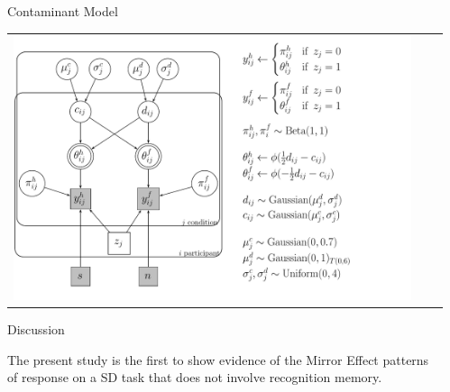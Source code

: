\documentclass[final]{beamer}
\newlength{\sepwid}
\newlength{\onecolwid}
\begin{document}
\begin{frame}[t]
\begin{columns}[t]
\begin{column}{\sepwid}\end{column} %

\setlength{\onecolwid}{0.252\paperwidth} %
\begin{column}{\onecolwid} %


\begin{alertblock}{Contaminant Model}


\begin{center}
\begin{tabular}{ccc}
\includegraphics[width=0.75\linewidth]{Figures/4_Contaminant.pdf}
\end{tabular}
\end{center}

\end{alertblock}



\begin{alertblock}{Discussion}

The present study is the first to show evidence of the Mirror Effect patterns of response on a SD task that does not involve recognition memory.\\


\end{alertblock}
\end{column}
\end{columns}
\end{frame}
\end{document}

